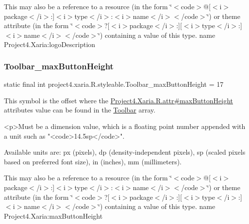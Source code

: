 This may also be a reference to a resource (in the form \char`\"{}$<$code$>$@\mbox{[}$<$i$>$package$<$/i$>$\+:\mbox{]}$<$i$>$type$<$/i$>$\+:$<$i$>$name$<$/i$>$$<$/code$>$\char`\"{}) or theme attribute (in the form \char`\"{}$<$code$>$?\mbox{[}$<$i$>$package$<$/i$>$\+:\mbox{]}\mbox{[}$<$i$>$type$<$/i$>$\+:\mbox{]}$<$i$>$name$<$/i$>$$<$/code$>$\char`\"{}) containing a value of this type.  name Project4.\+Xaria\+:logo\+Description \mbox{\label{classproject4_1_1xaria_1_1R_1_1styleable_a737f7e13fbcddd0d8f2c90ce3066e375}} 
\subsubsection{\texorpdfstring{Toolbar\+\_\+max\+Button\+Height}{Toolbar\_maxButtonHeight}}
{\footnotesize\ttfamily static final int project4.\+xaria.\+R.\+styleable.\+Toolbar\+\_\+max\+Button\+Height = 17\hspace{0.3cm}{\ttfamily [static]}}

This symbol is the offset where the \hyperlink{}{Project4.\+Xaria.\+R.\+attr\#max\+Button\+Height} attribute\textquotesingle{}s value can be found in the \hyperlink{classproject4_1_1xaria_1_1R_1_1styleable_af6c30f9e9e086f6bf4e510669443fa59}{Toolbar} array.

\begin{DoxyVerb}      <p>Must be a dimension value, which is a floating point number appended with a unit such as "<code>14.5sp</code>".
\end{DoxyVerb}
 Available units are\+: px (pixels), dp (density-\/independent pixels), sp (scaled pixels based on preferred font size), in (inches), mm (millimeters). 

This may also be a reference to a resource (in the form \char`\"{}$<$code$>$@\mbox{[}$<$i$>$package$<$/i$>$\+:\mbox{]}$<$i$>$type$<$/i$>$\+:$<$i$>$name$<$/i$>$$<$/code$>$\char`\"{}) or theme attribute (in the form \char`\"{}$<$code$>$?\mbox{[}$<$i$>$package$<$/i$>$\+:\mbox{]}\mbox{[}$<$i$>$type$<$/i$>$\+:\mbox{]}$<$i$>$name$<$/i$>$$<$/code$>$\char`\"{}) containing a value of this type.  name Project4.\+Xaria\+:max\+Button\+Height \mbox{\label{classproject4_1_1xaria_1_1R_1_1styleable_a7ce219ac5cd9c8b9b55a133796302f54}} 
